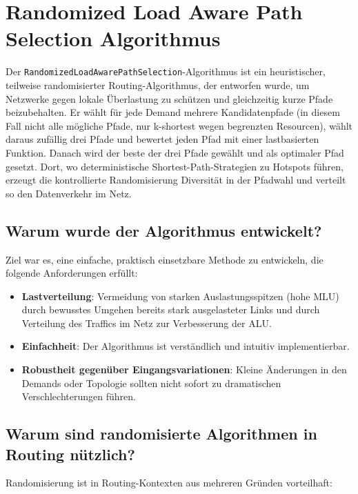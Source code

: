\chapter{Randomized Load Aware Path Selection Algorithmus}
\label{chapter:algorithmus2}
\graphicspath{{../bilder/}}

Der \texttt{RandomizedLoadAwarePathSelection}-Algorithmus ist ein heuristischer, teilweise randomisierter Routing-Algorithmus, der entworfen wurde, um Netzwerke gegen lokale Überlastung zu schützen und gleichzeitig kurze Pfade beizubehalten. Er wählt für jede Demand mehrere Kandidatenpfade (in diesem Fall nicht alle mögliche Pfade, nur k-shortest wegen begrenzten Resourcen), wählt daraus zufällig drei Pfade und bewertet jeden Pfad mit einer lastbasierten Funktion. Danach wird der beste der drei Pfade gewählt und als optimaler Pfad gesetzt. Dort, wo deterministische Shortest-Path-Strategien zu Hotspots führen, erzeugt die kontrollierte Randomisierung Diversität in der Pfadwahl und verteilt so den Datenverkehr im Netz.

\section{Warum wurde der Algorithmus entwickelt?}

Ziel war es, eine einfache, praktisch einsetzbare Methode zu entwickeln, die folgende Anforderungen erfüllt:

\begin{itemize}
\item \textbf{Lastverteilung}: Vermeidung von starken Auslastungsspitzen (hohe MLU) durch bewusstes Umgehen bereits stark ausgelasteter Links und durch Verteilung des Traffics im Netz zur Verbesserung der ALU.
\item \textbf{Einfachheit}: Der Algorithmus ist verständlich und intuitiv implementierbar.
\item \textbf{Robustheit gegenüber Eingangsvariationen}: Kleine Änderungen in den Demands oder Topologie sollten nicht sofort zu dramatischen Verschlechterungen führen.
\end{itemize}

\section{Warum sind randomisierte Algorithmen in Routing nützlich?}

Randomisierung ist in Routing-Kontexten aus mehreren Gründen vorteilhaft:

